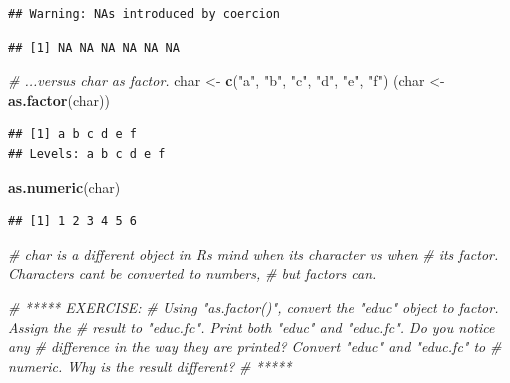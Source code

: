 \documentclass[
]{book}
\newenvironment{Shaded}{\begin{snugshade}}{\end{snugshade}}
\newcommand{\CommentTok}[1]{\textcolor[rgb]{0.56,0.35,0.01}{\textit{#1}}}
\newcommand{\FunctionTok}[1]{\textcolor[rgb]{0.13,0.29,0.53}{\textbf{#1}}}
\newcommand{\NormalTok}[1]{#1}
\newcommand{\OtherTok}[1]{\textcolor[rgb]{0.56,0.35,0.01}{#1}}
\newcommand{\StringTok}[1]{\textcolor[rgb]{0.31,0.60,0.02}{#1}}
\begin{document}
\begin{verbatim}
## Warning: NAs introduced by coercion
\end{verbatim}

\begin{verbatim}
## [1] NA NA NA NA NA NA
\end{verbatim}

\begin{Shaded}
\begin{Highlighting}[]
\CommentTok{\# ...versus char as factor.}
\NormalTok{char }\OtherTok{\textless{}{-}} \FunctionTok{c}\NormalTok{(}\StringTok{"a"}\NormalTok{, }\StringTok{"b"}\NormalTok{, }\StringTok{"c"}\NormalTok{, }\StringTok{"d"}\NormalTok{, }\StringTok{"e"}\NormalTok{, }\StringTok{"f"}\NormalTok{)}
\NormalTok{(char }\OtherTok{\textless{}{-}} \FunctionTok{as.factor}\NormalTok{(char))}
\end{Highlighting}
\end{Shaded}

\begin{verbatim}
## [1] a b c d e f
## Levels: a b c d e f
\end{verbatim}

\begin{Shaded}
\begin{Highlighting}[]
\FunctionTok{as.numeric}\NormalTok{(char)}
\end{Highlighting}
\end{Shaded}

\begin{verbatim}
## [1] 1 2 3 4 5 6
\end{verbatim}

\begin{Shaded}
\begin{Highlighting}[]
\CommentTok{\# char is a different object in R\textquotesingle{}s mind when it\textquotesingle{}s character vs when}
\CommentTok{\# it\textquotesingle{}s factor. Characters can\textquotesingle{}t be converted to numbers,}
\CommentTok{\# but factors can.}

\CommentTok{\# ***** EXERCISE: }
\CommentTok{\# Using "as.factor()", convert the "educ" object to factor. Assign the}
\CommentTok{\# result to "educ.fc". Print both "educ" and "educ.fc". Do you notice any}
\CommentTok{\# difference in the way they are printed? Convert "educ" and "educ.fc" to}
\CommentTok{\# numeric. Why is the result different?}
\CommentTok{\# *****}
\end{Highlighting}
\end{Shaded}
\end{document}
